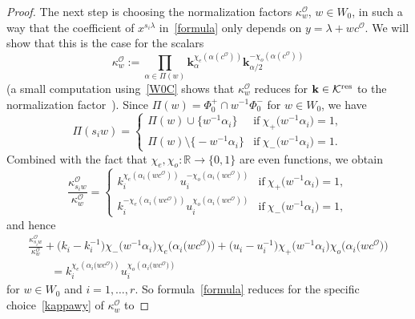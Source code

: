\documentclass[pdftex]{sigma}
\numberwithin{equation}{section}
\begin{document}
\begin{proof}
The next step is choosing the normalization factors $\kappa_w^\mathcal{O}$, $w\in W_0$, in such a way that the coefficient of $x^{s_i\lambda}$ in~\eqref{formula}
only depends on $y=\lambda+wc^\mathcal{O}$. We will show that this is the case for the scalars
\begin{equation}\label{kappawy}
\kappa_w^\mathcal{O}:=\prod_{\alpha\in\Pi(w)}\mathbf{k}_\alpha^{\chi_e(\alpha(c^\mathcal{O}))}\mathbf{k}_{\alpha/2}^{-\chi_o(\alpha(c^\mathcal{O}))}
\end{equation}
(a small computation using~\eqref{W0C} shows that $\kappa_w^\mathcal{O}$ reduces for $\mathbf{k}\in\mathcal{K}^{{\rm res}}$ to the normalization factor~\cite[(4.11)]{SSV2}).
Since $\Pi(w)=\Phi_0^+\cap w^{-1}\Phi_0^-$ for $w\in W_0$, we have
\begin{equation*}
\Pi(s_iw)=
\begin{cases}
\Pi(w)\cup\big\{w^{-1}\alpha_i\big\} &\text{if}\ \chi_+\bigl(w^{-1}\alpha_i\bigr)=1,\\
\Pi(w)\setminus\big\{-w^{-1}\alpha_i\big\} &\text{if} \
\chi_-\bigl(w^{-1}\alpha_i\bigr)=1.
\end{cases}
\end{equation*}
Combined with the fact that $\chi_e,\chi_o\colon \mathbb{R}\rightarrow\{0,1\}$ are even functions, we obtain
\begin{equation*}
\frac{\kappa_{s_iw}^\mathcal{O}}{\kappa_w^\mathcal{O}}=
\begin{cases}
k_i^{\chi_e(\alpha_i (wc^\mathcal{O}))}u_i^{-\chi_o(\alpha_i (wc^\mathcal{O} ))} &\text{if}\ \chi_+\bigl(w^{-1}\alpha_i\bigr)=1,\\
k_i^{-\chi_e(\alpha_i (wc^\mathcal{O}))}u_i^{\chi_o(\alpha_i (wc^\mathcal{O} ))} &\text{if}\ \chi_-\bigl(w^{-1}\alpha_i\bigr)=1,
\end{cases}
\end{equation*}
and hence
\begin{gather*}%
\frac{\kappa_{s_iw}^\mathcal{O}}{\kappa_w^\mathcal{O}}
+\bigl(k_i-k_i^{-1}\bigr)\chi_-\bigl(w^{-1}\alpha_i\bigr)\chi_e\bigl(\alpha_i\bigl(wc^\mathcal{O}\bigr)\bigr)+\bigl(u_i-u_i^{-1}\bigr)\chi_+\bigl(w^{-1}\alpha_i\bigr)\chi_o\bigl(\alpha_i\bigl(wc^\mathcal{O}\bigr)\bigr)\\
\qquad =k_i^{\chi_e(\alpha_i\bigl(wc^\mathcal{O}\bigr))}u_i^{\chi_o(\alpha_i\bigl(wc^\mathcal{O}\bigr))}
\end{gather*}
for $w\in W_0$ and $i=1,\dots,r$. So formula~\eqref{formula} reduces
for the specific choice~\eqref{kappawy} of $\kappa_w^\mathcal{O}$ to

\end{proof}
\end{document}

